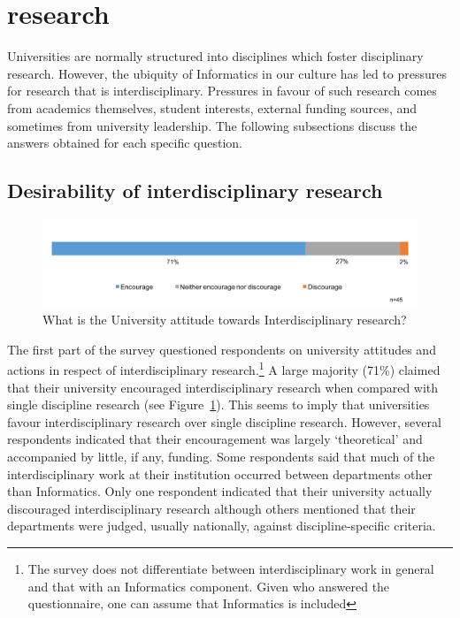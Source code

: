 \section{research}

Universities are normally structured into disciplines which foster disciplinary research. However, the ubiquity of Informatics in our culture has led to pressures for research that is interdisciplinary. Pressures in favour of such research comes from academics themselves, student interests, external funding sources, and sometimes from university leadership. The 
following subsections discuss the answers obtained for each specific
question.

\subsection{Desirability of interdisciplinary research}

\begin{figure}[h]
\centering
\includegraphics[width = \linewidth]{charts/1a.png}
\caption{What is the University attitude towards Interdisciplinary research?}
\label{sect1:Uattitude}
\end{figure}

The first part of the survey questioned respondents on university attitudes and actions in respect of interdisciplinary research.\footnote{The survey does not differentiate between interdisciplinary work in general and that with an Informatics component. Given who answered the questionnaire, one can assume that Informatics is included} A large majority (71\%) claimed that their university encouraged interdisciplinary research when compared with single discipline research (see Figure~\ref{sect1:Uattitude}). This seems to imply that universities favour interdisciplinary research over single discipline research.  However, several respondents indicated that their encouragement was largely `theoretical' and accompanied by little, if any, funding. Some respondents said that much of the interdisciplinary work at their institution occurred between departments other than Informatics. Only one respondent indicated that their university actually discouraged interdisciplinary research although others mentioned that their departments were judged, usually nationally, against discipline-specific criteria.

